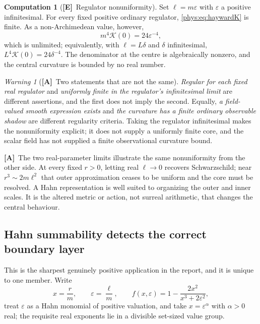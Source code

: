 \documentclass[11pt,letterpaper]{article}
\numberwithin{equation}{section}
\theoremstyle{definition}
\newtheorem{computation}[theorem]{Computation}
\theoremstyle{remark}
\newtheorem{warning}[theorem]{Warning}
\newcommand{\eps}{\varepsilon}
\newcommand{\Kret}{\mathcal K}
\newcommand{\TE}{\textcolor{TierE}{\textsf{\bfseries[E]}}}
\newcommand{\TA}{\textcolor{TierA}{\textsf{\bfseries[A]}}}
\begin{document}
\begin{computation}[\TE\ Regulator nonuniformity]
\label{phys:comp:regnonuniform}
Set $\ell=m\eps$ with $\eps$ a positive infinitesimal. For every fixed positive
ordinary regulator, \eqref{phys:eq:haywardK} is finite. As a non-Archimedean
value, however,
\begin{equation}\label{phys:eq:coreeps}
m^{4}\Kret(0)=24\eps^{-4},
\end{equation}
which is unlimited; equivalently, with $\ell=L\delta$ and $\delta$
infinitesimal, $L^{4}\Kret(0)=24\delta^{-4}$. The denominator at the centre is
algebraically nonzero, and the central curvature is bounded by no real number.
\end{computation}

\begin{warning}[\TA\ Two statements that are not the same]
\label{phys:warn:twostatements}
\emph{Regular for each fixed real regulator} and \emph{uniformly finite in the
regulator's infinitesimal limit} are different assertions, and the first does
not imply the second. Equally, \emph{a field-valued smooth expression exists}
and \emph{the curvature has a finite ordinary observable shadow} are different
regularity criteria. Taking the regulator infinitesimal makes the
nonuniformity explicit; it does not supply a uniformly finite core, and the
scalar field has not supplied a finite observational curvature bound.
\end{warning}

\TA\ The two real-parameter limits illustrate the same nonuniformity from the
other side. At every fixed $r>0$, letting real $\ell\to0$ recovers
Schwarzschild; near $r^{3}\sim2m\ell^{2}$ that outer approximation ceases to be
uniform and the core must be resolved. A Hahn representation is well suited to
organizing the outer and inner scales. It is the altered metric or action, not
surreal arithmetic, that changes the central behaviour.

\subsection{Hahn summability detects the correct boundary layer}
\label{phys:sub:matching}

This is the sharpest genuinely positive application in the report, and it is
unique to one member. Write
\begin{equation}\label{phys:eq:dimensionlesscore}
x=\frac rm,\qquad \eps=\frac{\ell}{m},
\qquad f(x,\eps)=1-\frac{2x^{2}}{x^{3}+2\eps^{2}},
\end{equation}
treat $\eps$ as a Hahn monomial of positive valuation, and take
$x=\eps^{\alpha}$ with $\alpha>0$ real; the requisite real exponents lie in a
divisible set-sized value group.
\end{document}
